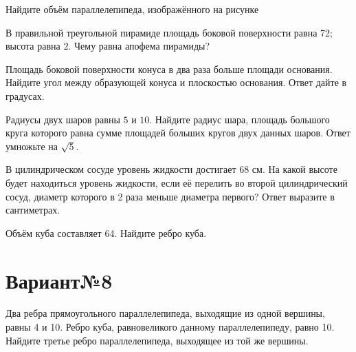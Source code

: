 \documentclass[4apaper]{article}
\begin{document}
\begin{taskBN}{1}
Найдите объём параллелепипеда, изображённого на рисунке
\end{taskBN}
\vspace*{2cm}

\begin{taskBN}{2}
В правильной треугольной пирамиде площадь боковой поверхности равна 72; высота равна 2. Чему равна апофема пирамиды?
\end{taskBN}

\begin{taskBN}{3}
Площадь боковой поверхности конуса в два раза больше площади основания. Найдите угол между образующей конуса и плоскостью основания. Ответ дайте в градусах.
\end{taskBN}

\begin{taskBN}{4}
Радиусы двух шаров равны $5$ и $10$. Найдите радиус шара, площадь большого круга которого равна сумме площадей больших кругов двух данных шаров. Ответ умножьте на $\sqrt{5}$.
\end{taskBN}

\begin{taskBN}{5}
В цилиндрическом сосуде уровень жидкости достигает 68 см. На какой высоте будет находиться уровень жидкости, если её перелить во второй цилиндрический сосуд, диаметр которого в 2 раза меньше диаметра первого? Ответ выразите в сантиметрах.
\end{taskBN}

\begin{taskBN}{6}
Объём куба составляет 64. Найдите ребро куба.
\end{taskBN}
\newpage\section*{Вариант№8}

\begin{taskBN}{1}
Два ребра прямоугольного параллелепипеда, выходящие из одной вершины, равны 4 и 10. Ребро куба, равновеликого данному параллелепипеду, равно 10. Найдите третье ребро параллелепипеда, выходящее из той же вершины.
\end{taskBN}
\end{document}

